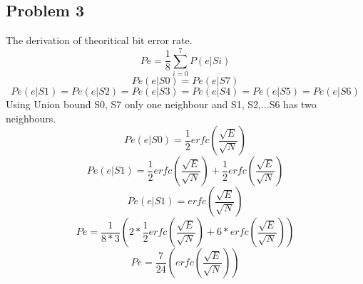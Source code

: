 \documentclass[a4paper,12pt]{report}
\begin{document}
    \subsection{Problem 3}
        The derivation of theoritical bit error rate.
        \begin{equation}
            Pe = \frac{1}{8} \displaystyle\sum_{i=0}^{7} P(e|Si) 
        \end{equation}
        \begin{equation}
            Pe(e|S0) = Pe(e|S7)
        \end{equation}
        \begin{equation}
            Pe(e|S1) = Pe(e|S2) = Pe(e|S3) = Pe(e|S4) = Pe(e|S5) = Pe(e|S6)
        \end{equation}
        Using Union bound S0, S7 only one neighbour and S1, S2,...S6 has two neighbours.
        \begin{equation}
            Pe(e|S0) = \frac{1}{2} erfc(\frac{\sqrt{E}}{\sqrt{N}})
        \end{equation}
        \begin{equation}
            Pe(e|S1) = \frac{1}{2} erfc(\frac{\sqrt{E}}{\sqrt{N}})
                + \frac{1}{2} erfc(\frac{\sqrt{E}}{\sqrt{N}})
        \end{equation}
        \begin{equation}
            Pe(e|S1) = erfc(\frac{\sqrt{E}}{\sqrt{N}})
        \end{equation}
        \begin{equation}
            Pe = \frac{1}{8 * 3} (2 * \frac{1}{2} erfc(\frac{\sqrt{E}}{\sqrt{N}}) 
                + 6 * erfc(\frac{\sqrt{E}}{\sqrt{N}}))
        \end{equation}
        \begin{equation}
            Pe = \frac{7}{24} (erfc(\frac{\sqrt{E}}{\sqrt{N}}))
        \end{equation}

    
\end{document}

